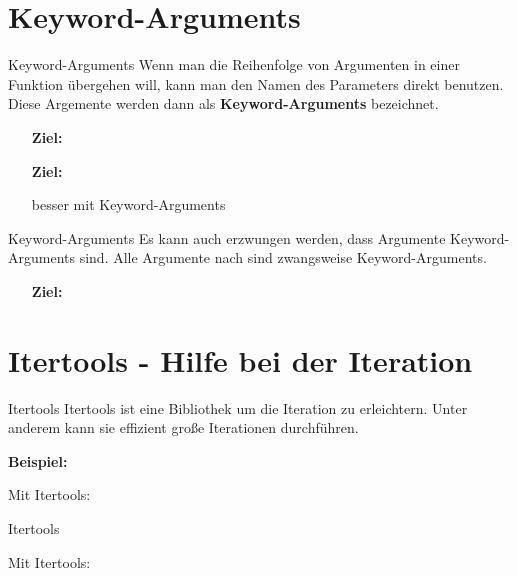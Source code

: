 \section{Keyword-Arguments}
\begin{frame}{Keyword-Arguments}
	Wenn man die Reihenfolge von Argumenten in einer Funktion übergehen will, kann man den Namen des Parameters direkt benutzen. Diese Argemente werden dann als \textbf{Keyword-Arguments} bezeichnet.
	
	
	\begin{itemize}
		\item[\textbf{Ziel:}] 
		
		\item[\textbf{Ziel:}] 
		
		besser mit Keyword-Arguments
		
	\end{itemize}
\end{frame}

\begin{frame}{Keyword-Arguments}
	Es kann auch erzwungen werden, dass Argumente Keyword-Arguments sind. Alle Argumente nach \codeline{, *, } sind zwangsweise Keyword-Arguments.
	\linebreak
	
	\begin{itemize}
		\item[\textbf{Ziel:}] 
		
	\end{itemize}
\end{frame}

\section{Itertools - Hilfe bei der Iteration}
\begin{frame}{Itertools}
	Itertools ist eine Bibliothek um die Iteration zu erleichtern. Unter anderem kann sie effizient große Iterationen durchführen.
	
	
	
	\textbf{Beispiel:}
	
	
	Mit Itertools:
	
\end{frame}

\begin{frame}{Itertools}
	
	
	Mit Itertools:
	
\end{frame}


